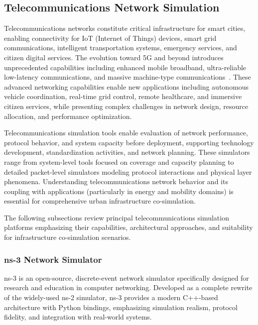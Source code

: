 \subsection{Telecommunications Network Simulation}

Telecommunications networks constitute critical infrastructure for smart cities, enabling connectivity for IoT (Internet of Things) devices, smart grid communications, intelligent transportation systems, emergency services, and citizen digital services. The evolution toward 5G and beyond introduces unprecedented capabilities including enhanced mobile broadband, ultra-reliable low-latency communications, and massive machine-type communications~\cite{telecom_challenges}. These advanced networking capabilities enable new applications including autonomous vehicle coordination, real-time grid control, remote healthcare, and immersive citizen services, while presenting complex challenges in network design, resource allocation, and performance optimization.

Telecommunications simulation tools enable evaluation of network performance, protocol behavior, and system capacity before deployment, supporting technology development, standardization activities, and network planning. These simulators range from system-level tools focused on coverage and capacity planning to detailed packet-level simulators modeling protocol interactions and physical layer phenomena. Understanding telecommunications network behavior and its coupling with applications (particularly in energy and mobility domains) is essential for comprehensive urban infrastructure co-simulation.

The following subsections review principal telecommunications simulation platforms emphasizing their capabilities, architectural approaches, and suitability for infrastructure co-simulation scenarios.


\subsubsection{ns-3 Network Simulator}

ns-3 is an open-source, discrete-event network simulator specifically designed for research and education in computer networking. Developed as a complete rewrite of the widely-used ns-2 simulator, ns-3 provides a modern C++-based architecture with Python bindings, emphasizing simulation realism, protocol fidelity, and integration with real-world systems.

